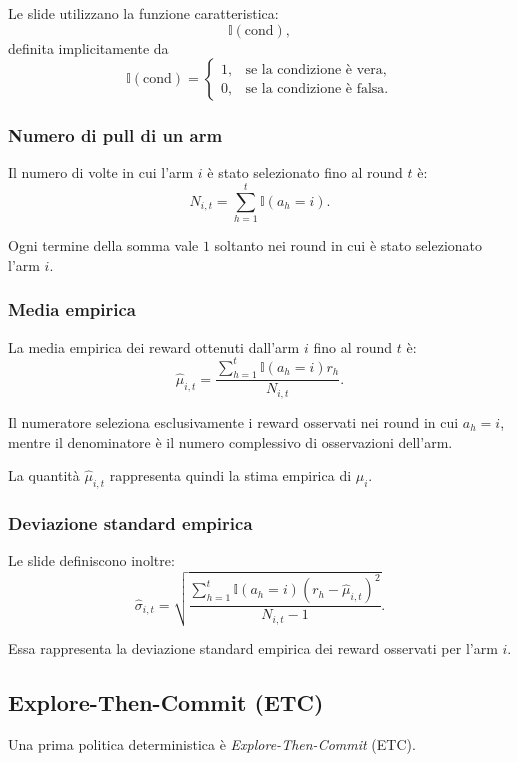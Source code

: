 Le slide utilizzano la funzione caratteristica:
\[
\mathbb{I}(\mathrm{cond}),
\]
definita implicitamente da
\[
\mathbb{I}(\mathrm{cond})=
\begin{cases}
1, & \text{se la condizione è vera},\\
0, & \text{se la condizione è falsa}.
\end{cases}
\]

\subsubsection{Numero di pull di un arm}

Il numero di volte in cui l'arm $i$ è stato selezionato fino al round $t$ è:
\[
N_{i,t}
=
\sum_{h=1}^{t}\mathbb{I}(a_h=i).
\]

Ogni termine della somma vale $1$ soltanto nei round in cui è stato selezionato l'arm $i$.

\subsubsection{Media empirica}

La media empirica dei reward ottenuti dall'arm $i$ fino al round $t$ è:
\[
\widehat{\mu}_{i,t}
=
\frac{
\sum_{h=1}^{t}\mathbb{I}(a_h=i)r_h
}{
N_{i,t}
}.
\]

Il numeratore seleziona esclusivamente i reward osservati nei round in cui $a_h=i$, mentre il denominatore è il numero complessivo di osservazioni dell'arm.

La quantità $\widehat{\mu}_{i,t}$ rappresenta quindi la stima empirica di $\mu_i$.

\subsubsection{Deviazione standard empirica}

Le slide definiscono inoltre:
\[
\widehat{\sigma}_{i,t}
=
\sqrt{
\frac{
\sum_{h=1}^{t}
\mathbb{I}(a_h=i)
\left(r_h-\widehat{\mu}_{i,t}\right)^2
}{
N_{i,t}-1
}
}.
\]

Essa rappresenta la deviazione standard empirica dei reward osservati per l'arm $i$.

\subsection{Explore-Then-Commit (ETC)}

Una prima politica deterministica è \emph{Explore-Then-Commit} (ETC).

